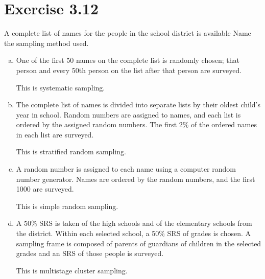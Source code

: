 \documentclass{article}
\begin{document}
\begin{minipage}{6in}
\section*{Exercise 3.12}
A complete list of names for the people in the school district is available Name the sampling method used.
\begin{enumerate}[a)]
	\item One of the first 50 names on the complete list is randomly chosen; that person and every 50th person on the list after that person are surveyed.
	
	\hspace{2em} This is systematic sampling.
	\item The complete list of names is divided into separate lists by their oldest child's year in school. Random numbers are assigned to names, and each list is ordered by the assigned random numbers. The first 2\% of the ordered names in each list are surveyed.
	
	\hspace{2em} This is stratified random sampling.
	\item A random number is assigned to each name using a computer random number generator. Names are ordered by the random numbers, and the first 1000 are surveyed.
	
	\hspace{2em} This is simple random sampling.
	\item A 50\% SRS is taken of the high schools and of the elementary schools from the district. Within each selected school, a 50\% SRS of grades is chosen. A sampling frame is composed of parents of guardians of children in the selected grades and an SRS of those people is surveyed.
	
	\hspace{2em} This is multistage cluster sampling.
\end{enumerate}
\end{minipage}
\end{document}

